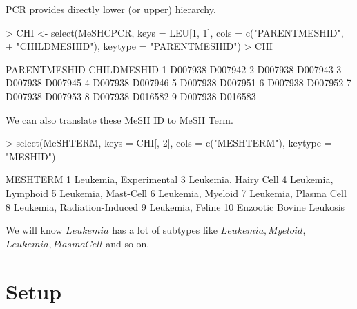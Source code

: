 \documentclass[11pt]{article}
\begin{document}
PCR provides directly lower (or upper) hierarchy.
\begin{center}
\begin{Schunk}
\begin{Sinput}
> CHI <- select(MeSHCPCR, keys = LEU[1, 1], cols = c("PARENTMESHID", 
+     "CHILDMESHID"), keytype = "PARENTMESHID")
> CHI
\end{Sinput}
\begin{Soutput}
  PARENTMESHID CHILDMESHID
1      D007938     D007942
2      D007938     D007943
3      D007938     D007945
4      D007938     D007946
5      D007938     D007951
6      D007938     D007952
7      D007938     D007953
8      D007938     D016582
9      D007938     D016583
\end{Soutput}
\end{Schunk}
\end{center}

We can also translate these MeSH ID to MeSH Term.
\begin{center}
\begin{Schunk}
\begin{Sinput}
> select(MeSHTERM, keys = CHI[, 2], cols = c("MESHTERM"), keytype = "MESHID")
\end{Sinput}
\begin{Soutput}
                      MESHTERM
1       Leukemia, Experimental
3         Leukemia, Hairy Cell
4           Leukemia, Lymphoid
5          Leukemia, Mast-Cell
6            Leukemia, Myeloid
7        Leukemia, Plasma Cell
8  Leukemia, Radiation-Induced
9             Leukemia, Feline
10    Enzootic Bovine Leukosis
\end{Soutput}
\end{Schunk}
\end{center}

We will know $Leukemia$ has a lot of subtypes like $Leukemia, Myeloid$, $Leukemia, Plasma Cell$ and so on.


\section{Setup}
\end{document}

